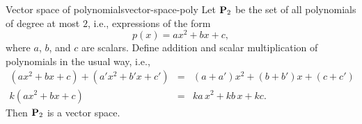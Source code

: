 \begin{example}{Vector space of polynomials}{vector-space-poly}
  Let $\mathbf{P}_2$%
   be the set of all polynomials%
   of degree at most $2$, i.e., expressions of the
  form
  \begin{equation*}
    p(x) = ax^2 + bx + c,
  \end{equation*}
  where $a$, $b$, and $c$ are scalars. Define addition%
   and scalar multiplication%
   of polynomials in the
  usual way, i.e.,
  \begin{eqnarray*}
    (ax^2 + bx + c) + (a'x^2 + b'x + c') &=& (a + a')x^2 + (b + b')x + (c + c') \\
    k(ax^2 + bx + c) &=& ka\,x^2 + kb\,x + kc.
  \end{eqnarray*}
  Then $\mathbf{P}_2$ is a vector space.
\end{example}

